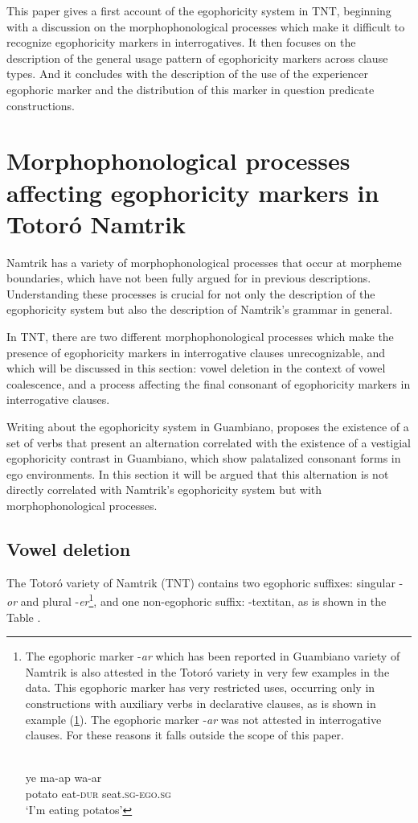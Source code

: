 \documentclass[output=paper]{langsci/langscibook}
\begin{document}
This paper gives a first account of the egophoricity system in TNT, beginning with a discussion on the morphophonological processes which make it difficult to recognize egophoricity markers in interrogatives. It then focuses on the description of the general usage pattern of egophoricity markers across clause types. And it concludes with the description of the use of the experiencer egophoric marker and the distribution of this marker in question predicate constructions.
  

\section{Morphophonological processes affecting egophoricity markers in Totoró Namtrik}\label{s:gg1}

Namtrik has a variety of morphophonological processes that occur at morpheme boundaries, which have not been fully argued for in previous descriptions. Understanding these processes is crucial for not only the description of the egophoricity system but also the description of Namtrik’s grammar in general. 

In TNT, there are two different morphophonological processes which make the presence of egophoricity markers in interrogative clauses unrecognizable, and which will be discussed in this section: vowel deletion in the context of vowel coalescence, and a process affecting the final consonant of egophoricity markers in interrogative clauses.

Writing about the egophoricity system in Guambiano, \citet{Norcliffe2018} proposes the existence of a set of verbs that present an alternation correlated with the existence of a vestigial egophoricity contrast in Guambiano, which show palatalized consonant forms in ego environments. In this section it will be argued that this alternation is not directly correlated with Namtrik’s egophoricity system but with morphophonological processes. 


\subsection{Vowel deletion}\label{s:gg1-1}

The Totoró variety of Namtrik (TNT) contains two egophoric suffixes: singular -\textit{or} and plural -\textit{er}\footnote{
	The egophoric marker -\textit{ar} which has been reported in Guambiano variety of Namtrik is also attested in the Totoró variety in very few examples in the data. This egophoric marker has very restricted uses, occurring only in constructions with auxiliary verbs in declarative clauses, as is shown in example (\ref{ex:gg-FN}). The egophoric marker -\textit{ar} was not attested in interrogative clauses. For these reasons it falls outside the scope of this paper.
	
	\ea\label{ex:gg-FN}
    \\
	\gll  ye	 ma-ap wa-ar \\
      potato eat-\textsc{dur} seat.\textsc{sg-ego.sg}\\
	\glt ‘I’m eating potatos’
	\z
	}, and one non-egophoric suffix: -textit{an}, as is shown in the Table \label{tab:gg1}.
	
\end{document}
